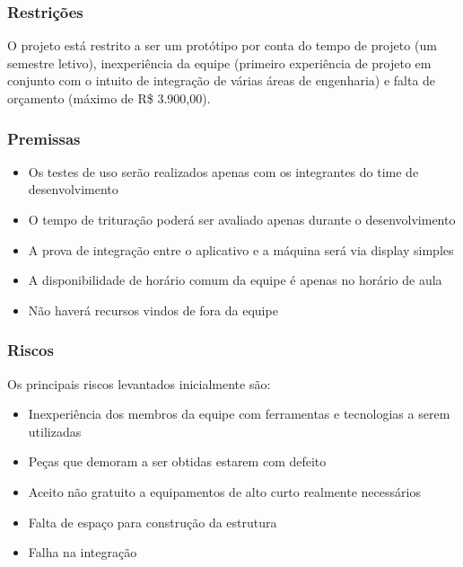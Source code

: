 \begin{apendicesenv}
\subsubsection{Restrições}
O projeto está restrito a ser um protótipo por conta do tempo de projeto (um semestre letivo), inexperiência da equipe (primeiro experiência de projeto em conjunto com o intuito de integração de várias áreas de engenharia) e falta de orçamento (máximo de R\$ 3.900,00).

\subsubsection{Premissas}
\begin{itemize}
    \item{Os testes de uso serão realizados apenas com os integrantes do time de desenvolvimento}
    \item{O tempo de trituração poderá ser avaliado apenas durante o desenvolvimento}
    \item{A prova de integração entre o aplicativo e a máquina será via display simples}
    \item{A disponibilidade de horário comum da equipe é apenas no horário de aula}
    \item{Não haverá recursos vindos de fora da equipe}
\end{itemize}

\subsubsection{Riscos}
Os principais riscos levantados inicialmente são:
\begin{itemize}
    \item{Inexperiência dos membros da equipe com ferramentas e tecnologias a serem utilizadas}
    \item{Peças que demoram a ser obtidas estarem com defeito}
    \item{Aceito não gratuito a equipamentos de alto curto realmente necessários}
    \item{Falta de espaço para construção da estrutura}
    \item{Falha na integração}
\end{itemize}


\end{apendicesenv}
